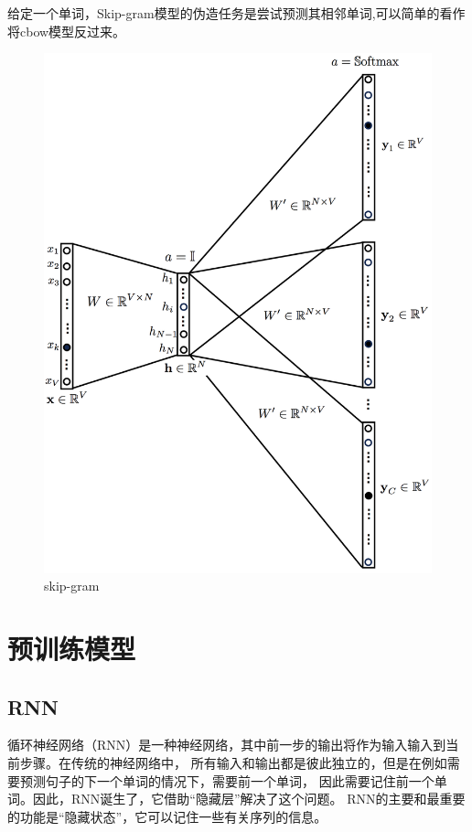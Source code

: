 给定一个单词，Skip-gram模型的伪造任务是尝试预测其相邻单词,可以简单的看作将cbow模型反过来。

\begin{figure}[htbp]
  \centering
  \includegraphics[scale=0.15]{./images/skip.jpg}
  \caption{skip-gram}
  \label{fig:skip}
\end{figure}

\section{预训练模型}

\subsection{RNN}

循环神经网络（RNN）是一种神经网络，其中前一步的输出将作为输入输入到当前步骤。在传统的神经网络中，
所有输入和输出都是彼此独立的，但是在例如需要预测句子的下一个单词的情况下，需要前一个单词，
因此需要记住前一个单词。因此，RNN诞生了，它借助“隐藏层”解决了这个问题。
RNN的主要和最重要的功能是“隐藏状态”，它可以记住一些有关序列的信息。

